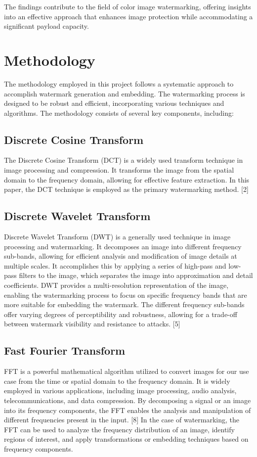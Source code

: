 \documentclass[conference]{IEEEtran}
\begin{document}
The findings contribute to the field of color image watermarking, offering insights into an effective approach that enhances image protection while accommodating a significant payload capacity.



\section{Methodology}
The methodology employed in this project follows a systematic approach to accomplish watermark generation and embedding. The watermarking process is designed to be robust and efficient, incorporating various techniques and algorithms. The methodology consists of several key components, including:

\subsection{Discrete Cosine Transform}
The Discrete Cosine Transform (DCT) is a widely used transform technique in image processing and compression. It transforms the image from the spatial domain to the frequency domain, allowing for effective feature extraction. In this paper, the DCT technique is employed as the primary watermarking method. [2]

\subsection{Discrete Wavelet Transform}
Discrete Wavelet Transform (DWT) is a generally used technique in image processing and watermarking. It decomposes an image into different frequency sub-bands, allowing for efficient analysis and modification of image details at multiple scales. It accomplishes this by applying a series of high-pass and low-pass filters to the image, which separates the image into approximation and detail coefficients.
DWT provides a multi-resolution representation of the image, enabling the watermarking process to focus on specific frequency bands that are more suitable for embedding the watermark. The different frequency sub-bands offer varying degrees of perceptibility and robustness, allowing for a trade-off between watermark visibility and resistance to attacks. [5]

\subsection{Fast Fourier Transform}
FFT is a powerful mathematical algorithm utilized to convert images for our use case from the time or spatial domain to the frequency domain. 
It is widely employed in various applications, including image processing, audio analysis, telecommunications, and data compression. By decomposing a signal or an image into its frequency components, the FFT enables the analysis and manipulation of different frequencies present in the input. [8]
In the case of watermarking, the FFT can be used to analyze the frequency distribution of an image, identify regions of interest, and apply transformations or embedding techniques based on frequency components.
\end{document}
